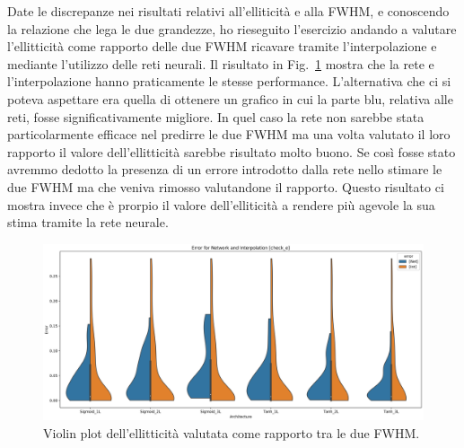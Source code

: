 \documentclass[12pt,a4paper,final]{book}
\begin{document}
\newpage

Date le discrepanze nei risultati relativi all'elliticità e alla FWHM, e conoscendo la relazione che lega le due grandezze, ho rieseguito l'esercizio andando a valutare l'ellitticità come rapporto delle due FWHM ricavare tramite l'interpolazione e mediante l'utilizzo delle reti neurali. Il risultato in Fig.~\ref{violin_check} mostra che la rete e l'interpolazione hanno praticamente le stesse performance.
L'alternativa che ci si poteva aspettare era quella di ottenere un grafico in cui la parte blu, relativa alle reti, fosse significativamente migliore. In quel caso la rete non sarebbe stata particolarmente efficace nel predirre le due FWHM ma una volta valutato il loro rapporto il valore dell'ellitticità sarebbe risultato molto buono. Se così fosse stato avremmo dedotto la presenza di un errore introdotto dalla rete nello stimare le due FWHM ma che veniva rimosso valutandone il rapporto.
Questo risultato ci mostra invece che è prorpio il valore dell'elliticità a rendere più agevole la sua stima tramite la rete neurale.

\begin{figure}[!ht]
	\centering
    \includegraphics[width=\linewidth]{../figures/violin_plot_check_e.png}
    \caption{Violin plot dell'ellitticità valutata come rapporto tra le due FWHM.}
    \label{violin_check}
\end{figure}

\end{document}
